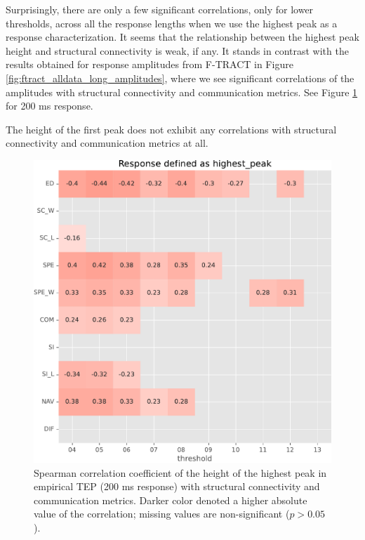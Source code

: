 Surprisingly, there are only a few significant correlations, only for lower thresholds, across all the response lengths when we use the highest peak as a response characterization. It seems that the relationship between the highest peak height and structural connectivity is weak, if any. It stands in contrast with the results obtained for response amplitudes from F-TRACT in Figure \ref{fig:ftract_alldata_long_amplitudes}, where we see significant correlations of the amplitudes with structural connectivity and communication metrics. See Figure \ref{fig:tms_heighest_200} for 200 ms response.

The height of the first peak does not exhibit any correlations with structural connectivity and communication metrics at all. 

\begin{figure}
    \centering
    \includegraphics[width=\textwidth]{images/nootebook_generated/pytepfit_results/empirical/200/not_over_threshold_nan/Response defined as highest_peak.pdf}
    \caption[TEPs highest peak (200 ms) correlations]{Spearman correlation coefficient of the height of the highest peak in empirical TEP (200 ms response) with structural connectivity and communication metrics. Darker color denoted a higher absolute value of the correlation; missing values are non-significant ($p>0.05$).}
    \label{fig:tms_heighest_200}
\end{figure}


